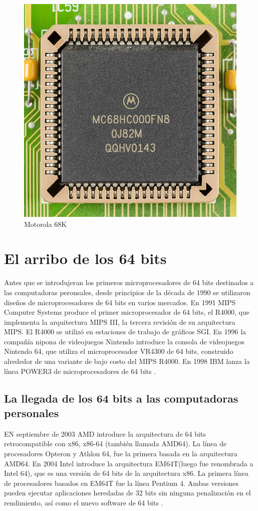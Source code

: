 \begin{figure}[htb]
	\centering
	\includegraphics[scale = 0.15]{Graphics/Motorola_MC68HC000FN8-0695.jpg}
	\caption{Motorola 68K}
	\label{fig:17}
\end{figure}

\section{El arribo de los 64 bits}
Antes que se introdujeran los primeros microprocesadores de 64 bits destinados a las computadoras peronsales, desde principios de la década de 1990 se 
utilizaron diseños de microprocesadores de 64 bits en varios mercados. En 1991 MIPS Computer Systems produce el primer microprocesador de 64 bits, el R4000, 
que implementa la arquitectura MIPS III, la tercera revisión de su arquitectura MIPS. El R4000 se utilizó en estaciones de trabajo de gráficos SGI. En 1996
la compañía nipona de videojuegos Nintendo introduce la consola de videojuegos Nintendo 64, que utiliza el microprocesador VR4300 de 64 bits, construido alrededor 
de una variante de bajo costo del MIPS R4000. En 1998 IBM lanza la línea POWER3 de microprocesadores de 64 bits .
\subsection{La llegada de los 64 bits a las computadoras personales}
EN septiembre de 2003 AMD introduce  la arquitectura de 64 bits retrocompatible con x86, x86-64 (también llamada AMD64). La línea de procesadores Opteron 
y Athlon 64, fue la primera basada en la arquitectura AMD64. En 2004 Intel introduce la arquitectura EM64T(luego fue renombrada a Intel 64), que es una versión de 64 bits 
de la arquitectura x86. La primera línea de procesadores basados en EM64T fue la línea Pentium 4.  Ambas versiones pueden ejecutar aplicaciones heredadas de 32 bits sin 
ninguna penalización en el rendimiento, así como el nuevo software de 64 bits .

